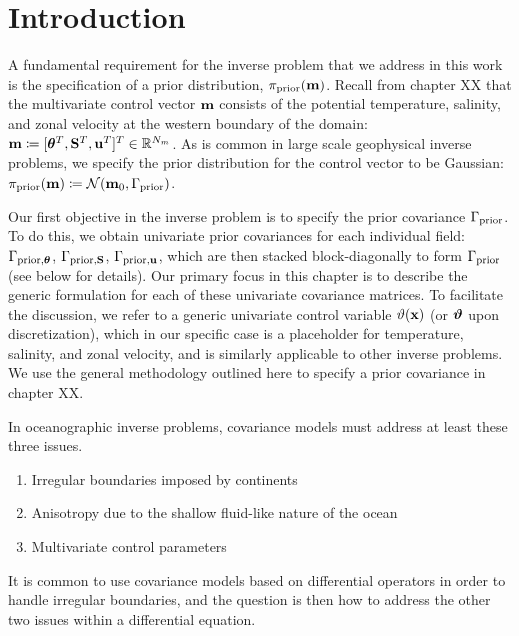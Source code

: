 \section{Introduction}
\label{sec:intro}
A fundamental requirement for the inverse problem that we address in this work
is the specification of a prior distribution, $\pi_{\text{prior}}(\mathbf{m})$.
Recall from chapter XX that the multivariate control vector
$\mathbf{m}$ consists of the
potential temperature, salinity, and zonal velocity at the western boundary of
the domain:
$\mathbf{m} \coloneqq [{\bm{\theta}}^T,\mathbf{S}^T,\mathbf{u}^T]^T \in\mathbb{R}^{N_m}$.
As is common in large scale geophysical inverse problems, we specify the prior
distribution for the control vector
to be Gaussian: $\pi_{\text{prior}}(\mathbf{m}) \coloneqq \mathcal{N}(\mathbf{m}_0, \Gamma_{\text{prior}})$.

Our first objective in the inverse problem is to specify the prior
covariance $\Gamma_{\text{prior}}$.
To do this, we obtain univariate prior covariances for
each individual field: $\Gamma_{\text{prior,}{\bm{\theta}}}$, $\Gamma_{\text{prior,}\mathbf{S}}$,
$\Gamma_{\text{prior,}\mathbf{u}}$, which are then stacked block-diagonally to form
$\Gamma_{\text{prior}}$ (see below for details).
Our primary focus in this chapter is to describe the generic formulation for
each of these univariate covariance matrices.
To facilitate the discussion, we refer to a generic univariate control variable
$\vartheta(\mathbf{x})$ (or $\bm{\vartheta}$ upon discretization), which in our specific case is a
placeholder for temperature, salinity, and zonal velocity, and is similarly
applicable to other inverse problems.
We use the general methodology outlined here to specify a prior covariance in
chapter XX.

In oceanographic inverse problems, covariance models must address at least
these three issues.
\begin{enumerate}
    \item Irregular boundaries imposed by continents
    \item Anisotropy due to the shallow fluid-like nature of the ocean
    \item Multivariate control parameters
\end{enumerate}
It is common to use covariance models based on differential operators in order
to handle irregular boundaries, and the question is then how to address the
other two issues within a differential equation.

